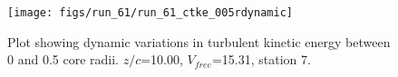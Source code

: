 \begin{figure}[H]
\centering
\texttt{[image: figs/run\_61/run\_61\_ctke\_005rdynamic]}
\caption{Plot showing dynamic variations in turbulent kinetic energy between 0 and 0.5 core radii. $z/c$=10.00, $V_{free}$=15.31, station 7.}
\end{figure}


